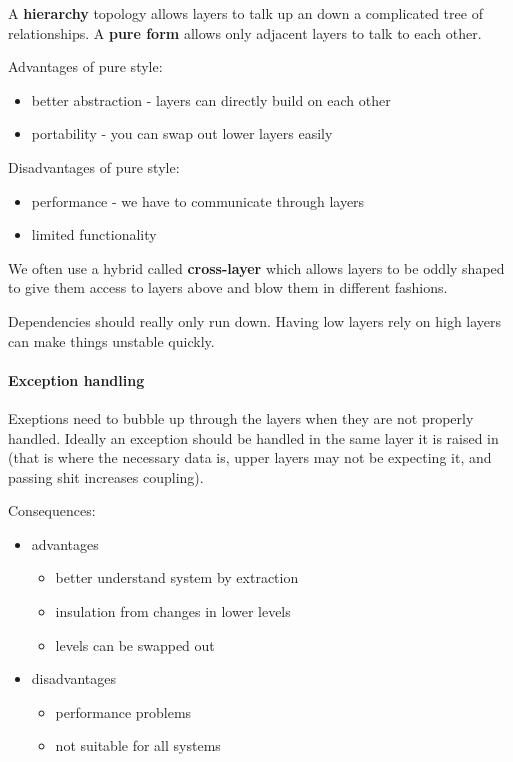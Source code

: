 \documentclass{article}
\begin{document}
A \textbf{hierarchy} topology allows layers to talk up an down a complicated tree of relationships. A \textbf{pure form} allows only adjacent layers to talk to each other.

Advantages of pure style:
\begin{itemize}
    \item better abstraction - layers can directly build on each other
    \item portability - you can swap out lower layers easily
\end{itemize}
Disadvantages of pure style:
\begin{itemize}
    \item performance - we have to communicate through layers
    \item limited functionality
\end{itemize}

We often use a hybrid called \textbf{cross-layer} which allows layers to be oddly shaped to give them access to layers above and blow them in different fashions.

Dependencies should really only run down. Having low layers rely on high layers can make things unstable quickly.

\paragraph{Exception handling} %
\label{par:exception_handling}
Exeptions need to bubble up through the layers when they are not properly handled. Ideally an exception should be handled in the same layer it is raised in (that is where the necessary data is, upper layers may not be expecting it, and passing shit increases coupling).

Consequences:
\begin{itemize}
    \item advantages
    \begin{itemize}
        \item better understand system by extraction
        \item insulation from changes in lower levels
        \item levels can be swapped out
    \end{itemize}
    \item disadvantages
    \begin{itemize}
        \item performance problems
        \item not suitable for all systems
    \end{itemize}
\end{itemize}
\end{document}
